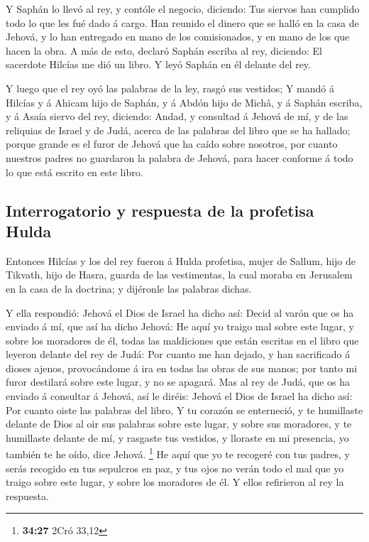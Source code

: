  Y Saphán lo llevó al rey, y contóle el negocio,
diciendo: Tus siervos han cumplido todo lo que les fué dado á cargo.
 Han reunido el dinero que se halló en la casa de Jehová,
y lo han entregado en mano de los comisionados, y en mano de los que
hacen la obra.  A más de esto, declaró Saphán escriba al
rey, diciendo: El sacerdote Hilcías me dió un libro. Y leyó Saphán en él
delante del rey.

 Y luego que el rey oyó las palabras de la ley, rasgó sus
vestidos;  Y mandó á Hilcías y á Ahicam hijo de Saphán, y
á Abdón hijo de Michâ, y á Saphán escriba, y á Asaía siervo del rey,
diciendo:  Andad, y consultad á Jehová de mí, y de las
reliquias de Israel y de Judá, acerca de las palabras del libro que se
ha hallado; porque grande es el furor de Jehová que ha caído sobre
nosotros, por cuanto nuestros padres no guardaron la palabra de Jehová,
para hacer conforme á todo lo que está escrito en este libro.

\hypertarget{interrogatorio-y-respuesta-de-la-profetisa-hulda}{%
\subsection{Interrogatorio y respuesta de la profetisa
Hulda}\label{interrogatorio-y-respuesta-de-la-profetisa-hulda}}

 Entonces Hilcías y los del rey fueron á Hulda profetisa,
mujer de Sallum, hijo de Tikvath, hijo de Hasra, guarda de las
vestimentas, la cual moraba en Jerusalem en la casa de la doctrina; y
dijéronle las palabras dichas.

 Y ella respondió: Jehová el Dios de Israel ha dicho así:
Decid al varón que os ha enviado á mí, que así ha dicho Jehová:
 He aquí yo traigo mal sobre este lugar, y sobre los
moradores de él, todas las maldiciones que están escritas en el libro
que leyeron delante del rey de Judá:  Por cuanto me han
dejado, y han sacrificado á dioses ajenos, provocándome á ira en todas
las obras de sus manos; por tanto mi furor destilará sobre este lugar, y
no se apagará.  Mas al rey de Judá, que os ha enviado á
consultar á Jehová, así le diréis: Jehová el Dios de Israel ha dicho
así: Por cuanto oiste las palabras del libro,  Y tu
corazón se enterneció, y te humillaste delante de Dios al oir sus
palabras sobre este lugar, y sobre sus moradores, y te humillaste
delante de mí, y rasgaste tus vestidos, y lloraste en mi presencia, yo
también te he oído, dice Jehová. \footnote{\textbf{34:27} 2Cró 33,12}
 He aquí que yo te recogeré con tus padres, y serás
recogido en tus sepulcros en paz, y tus ojos no verán todo el mal que yo
traigo sobre este lugar, y sobre los moradores de él. Y ellos refirieron
al rey la respuesta.

